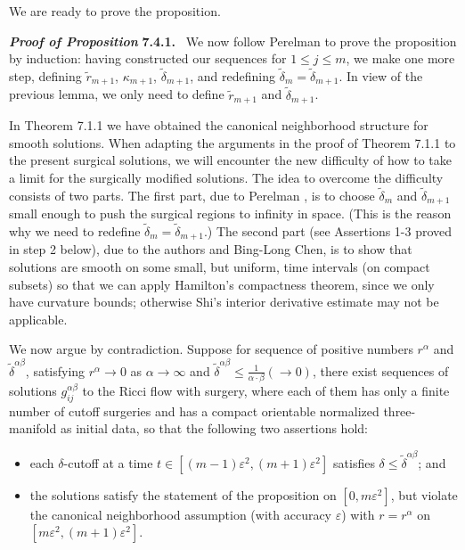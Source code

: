We are ready to prove the proposition.

\medskip
{\bf\em Proof of Proposition} {\bf 7.4.1.} \ We now follow
Perelman \cite{P2} to prove the proposition by induction: having
constructed our sequences for $1\leq j\leq m$, we make one more
step, defining $\widetilde{r}_{m+1}$, $\kappa_{m+1}$,
$\widetilde{\delta}_{m+1}$, and redefining
$\widetilde{\delta}_m=\widetilde{\delta}_{m+1}$. In view of the
previous lemma, we only need to define $\widetilde{r}_{m+1}$ and
$\widetilde{\delta}_{m+1}$.

In Theorem 7.1.1 we have obtained the canonical neighborhood
structure for smooth solutions. When adapting the arguments in the
proof of Theorem 7.1.1 to the present surgical solutions, we will
encounter the new difficulty of how to take a limit for the
surgically modified solutions. The idea to overcome the difficulty
consists of two parts. The first part, due to Perelman \cite{P2},
is to choose $\widetilde{\delta}_{m}$ and
$\widetilde{\delta}_{m+1}$ small enough to push the surgical
regions to infinity in space. (This is the reason why we need to
redefine $\widetilde{\delta}_{m} = \widetilde{\delta}_{m+1}$.) The
second part (see Assertions 1-3 proved in step 2 below), due to
the authors and Bing-Long Chen, is to show that solutions are
smooth on some small, but uniform, time intervals (on compact
subsets) so that we can apply Hamilton's compactness theorem,
since we only have curvature bounds; otherwise Shi's interior
derivative estimate may not be applicable.

We now argue by contradiction. Suppose for sequence of positive
numbers $r^{\alpha}$ and $\widetilde{\delta}^{\alpha\beta}$,
satisfying $r^{\alpha}\rightarrow0$ as $\alpha\rightarrow\infty$ and
$\widetilde{\delta}^{\alpha\beta}\leq\frac{1}{\alpha \cdot
\beta}(\rightarrow0)$, there exist sequences of solutions
$g^{\alpha\beta}_{ij}$ to the Ricci flow with surgery, where each of
them has only a finite number of cutoff surgeries and has a compact
orientable normalized three-manifold as initial data, so that the
following two assertions hold:
\begin{itemize}
\item[(i)] each $\delta$-cutoff at a time
$t\in[(m-1)\varepsilon^2,(m+1)\varepsilon^2]$ satisfies $\delta
\leq \widetilde{\delta}^{\alpha\beta}$; and \item[(ii)] the
solutions satisfy the statement of the proposition on
$[0,m\varepsilon^2]$, but violate the canonical neighborhood
assumption (with accuracy $\varepsilon$) with $r=r^{\alpha}$ on
$[m\varepsilon^2,(m+1)\varepsilon^2]$.
\end{itemize}

